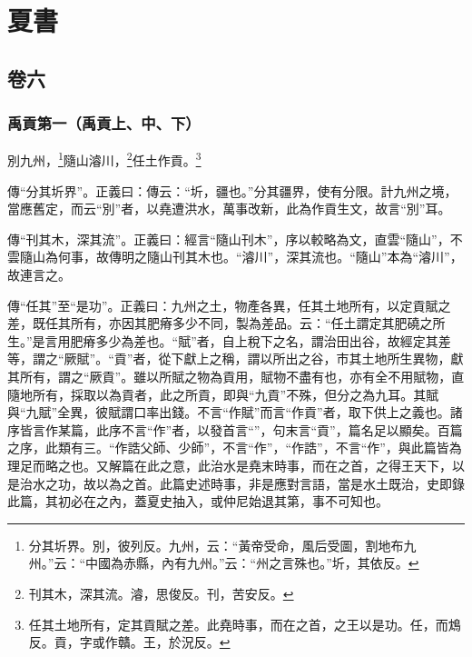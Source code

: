 

\part{夏書}


\chapter{卷六}


\section{禹貢第一（禹貢上、中、下）}

別九州，\footnote{分其圻界。別，彼列反。九州，云：“黃帝受命，風后受圖，割地布九州。”云：“中國為赤縣，內有九州。”云：“州之言殊也。”圻，其依反。}隨山濬川，\footnote{刊其木，深其流。濬，思俊反。刊，苦安反。}任土作貢。\footnote{任其土地所有，定其貢賦之差。此堯時事，而在之首，之王以是功。任，而鴆反。貢，字或作贛。王，於況反。}

{\noindent\zhuan{}\fzbyks 傳“分其圻界”。正義曰：傳云：“圻，疆也。”分其疆界，使有分限。計九州之境，當應舊定，而云“別”者，以堯遭洪水，萬事改新，此為作貢生文，故言“別”耳。 \par}

{\noindent\zhuan{}\fzbyks 傳“刊其木，深其流”。正義曰：經言“隨山刊木”，序以較略為文，直雲“隨山”，不雲隨山為何事，故傳明之隨山刊其木也。“濬川”，深其流也。“隨山”本為“濬川”，故連言之。 \par}

{\noindent\zhuan{}\fzbyks 傳“任其”至“是功”。正義曰：九州之土，物產各異，任其土地所有，以定貢賦之差，既任其所有，亦因其肥瘠多少不同，製為差品。云：“任土謂定其肥磽之所生。”是言用肥瘠多少為差也。“賦”者，自上稅下之名，謂治田出谷，故經定其差等，謂之“厥賦”。“貢”者，從下獻上之稱，謂以所出之谷，市其土地所生異物，獻其所有，謂之“厥貢”。雖以所賦之物為貢用，賦物不盡有也，亦有全不用賦物，直隨地所有，採取以為貢者，此之所貢，即與“九貢”不殊，但分之為九耳。其賦與“九賦”全異，彼賦謂口率出錢。不言“作賦”而言“作貢”者，取下供上之義也。諸序皆言作某篇，此序不言“作”者，以發首言“”，句末言“貢”，篇名足以顯矣。百篇之序，此類有三。“作誥父師、少師”，不言“作”，“作誥”，不言“作”，與此篇皆為理足而略之也。又解篇在此之意，此治水是堯末時事，而在之首，之得王天下，以是治水之功，故以為之首。此篇史述時事，非是應對言語，當是水土既治，史即錄此篇，其初必在之內，蓋夏史抽入，或仲尼始退其第，事不可知也。 \par}

